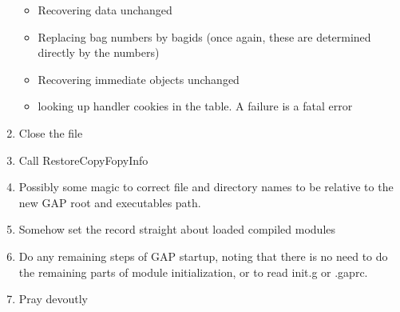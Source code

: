 \documentclass[11pt]{article}
\begin{document}
\begin{enumerate}
\begin{itemize}
\item Recovering data unchanged
\item Replacing bag numbers by bagids (once again, these are
determined directly by the numbers)
\item Recovering immediate objects unchanged
\item looking up handler cookies in the table. A failure is a fatal
error
\end{itemize}
\item Close the file
\item Call RestoreCopyFopyInfo
\item Possibly some magic to correct file and directory names to be
relative to the new GAP root and executables path. 
\item Somehow set the record straight about loaded compiled modules
\item Do any remaining steps of GAP startup, noting that there is no
need to do the remaining parts of module initialization, or to read
init.g or .gaprc.
\item Pray devoutly
\end{enumerate}
\end{document}

